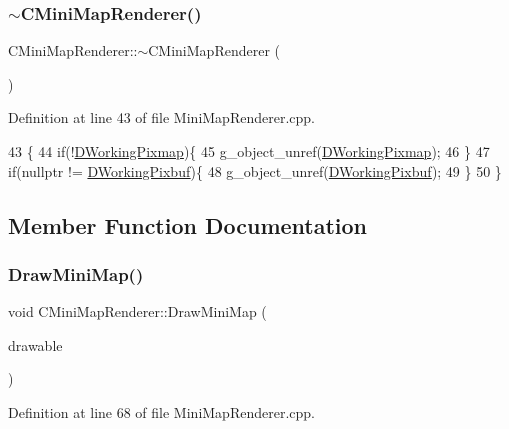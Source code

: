 \subsubsection{\texorpdfstring{$\sim$\+C\+Mini\+Map\+Renderer()}{~CMiniMapRenderer()}}
{\footnotesize\ttfamily C\+Mini\+Map\+Renderer\+::$\sim$\+C\+Mini\+Map\+Renderer (\begin{DoxyParamCaption}{ }\end{DoxyParamCaption})}



Definition at line 43 of file Mini\+Map\+Renderer.\+cpp.


\begin{DoxyCode}
43                                    \{
44     \textcolor{keywordflow}{if}(!\hyperlink{classCMiniMapRenderer_a53bf622d2048ea136ae256e8d4b81fb5}{DWorkingPixmap})\{
45         g\_object\_unref(\hyperlink{classCMiniMapRenderer_a53bf622d2048ea136ae256e8d4b81fb5}{DWorkingPixmap});
46     \}
47     \textcolor{keywordflow}{if}(\textcolor{keyword}{nullptr} != \hyperlink{classCMiniMapRenderer_ad5f723d83a60882a3e82af72e84ff522}{DWorkingPixbuf})\{
48         g\_object\_unref(\hyperlink{classCMiniMapRenderer_ad5f723d83a60882a3e82af72e84ff522}{DWorkingPixbuf});
49     \}
50 \}
\end{DoxyCode}


\subsection{Member Function Documentation}
\hypertarget{classCMiniMapRenderer_aa7f3db866eeea3f92725f2b25ceee23c}{}\label{classCMiniMapRenderer_aa7f3db866eeea3f92725f2b25ceee23c} 
\subsubsection{\texorpdfstring{Draw\+Mini\+Map()}{DrawMiniMap()}}
{\footnotesize\ttfamily void C\+Mini\+Map\+Renderer\+::\+Draw\+Mini\+Map (\begin{DoxyParamCaption}\item[{Gdk\+Drawable $\ast$}]{drawable }\end{DoxyParamCaption})}



Definition at line 68 of file Mini\+Map\+Renderer.\+cpp.


